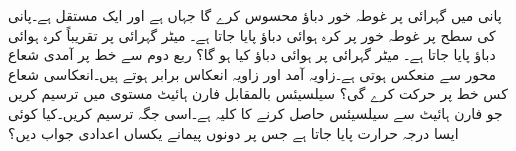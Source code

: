 \quad 
پانی میں  گہرائی پر غوطہ خور  دباؤ محسوس کرے گا جہاں  ہے  اور  ایک  مستقل ہے۔پانی کی سطح پر  غوطہ خور پر    کرہ ہوائی دباؤ پایا جاتا ہے۔  میٹر گہرائی پر تقریباً   کرہ ہوائی دباؤ پایا جاتا ہے۔ میٹر گہرائی پر  ہوائی دباؤ کیا ہو گا؟
\quad
ربع دوم سے خط  پر آمدی شعاع محور  سے منعکس ہوتی ہے۔زاویہ آمد اور زاویہ انعکاس برابر ہوتے ہیں۔انعکاسی شعاع کس خط پر حرکت کرے گی؟
\quad 
سیلسیئس بالمقابل فارن ہائیٹ مستوی  میں  ترسیم کریں جو فارن ہائیٹ سے سیلسیئس حاصل کرنے کا کلیہ ہے۔اسی جگہ  ترسیم کریں۔کیا کوئی ایسا  درجہ حرارت پایا جاتا ہے جس پر دونوں پیمانے یکساں اعدادی جواب دیں؟

\\

